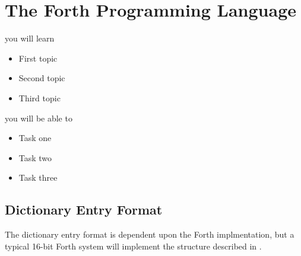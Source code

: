 \setchapterpreamble[u]{\margintoc}
\chapter{The Forth Programming Language}

%
\begin{kaobox}[frametitle=In This Chapter]
you will learn
\begin{itemize}
	\item First topic
	\item Second topic
        \item Third topic
\end{itemize}

you will be able to
\begin{itemize}
        \item Task one
        \item Task two
        \item Task three
\end{itemize}
\end{kaobox}

\blindtext

%
\section{Dictionary Entry Format}

The dictionary entry format is dependent upon the Forth implmentation, but a typical
16-bit Forth system will implement the structure described in .

